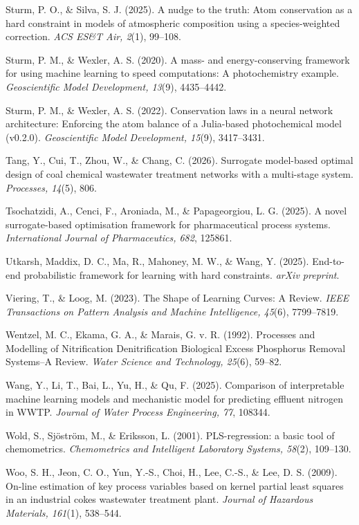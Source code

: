 \documentclass[a4paper,fleqn]{cas-sc}
\begin{document}
\noindent Sturm, P. O., \& Silva, S. J. (2025). A nudge to the truth: Atom conservation as a hard constraint in models of atmospheric composition using a species-weighted correction. \textit{ACS ES\&T Air, 2}(1), 99--108.

\noindent Sturm, P. M., \& Wexler, A. S. (2020). A mass- and energy-conserving framework for using machine learning to speed computations: A photochemistry example. \textit{Geoscientific Model Development, 13}(9), 4435--4442.

\noindent Sturm, P. M., \& Wexler, A. S. (2022). Conservation laws in a neural network architecture: Enforcing the atom balance of a Julia-based photochemical model (v0.2.0). \textit{Geoscientific Model Development, 15}(9), 3417--3431.

\noindent Tang, Y., Cui, T., Zhou, W., \& Chang, C. (2026). Surrogate model-based optimal design of coal chemical wastewater treatment networks with a multi-stage system. \textit{Processes, 14}(5), 806.

\noindent Tsochatzidi, A., Cenci, F., Aroniada, M., \& Papageorgiou, L. G. (2025). A novel surrogate-based optimisation framework for pharmaceutical process systems. \textit{International Journal of Pharmaceutics, 682}, 125861.

\noindent Utkarsh, Maddix, D. C., Ma, R., Mahoney, M. W., \& Wang, Y. (2025). End-to-end probabilistic framework for learning with hard constraints. \textit{arXiv preprint}.

\noindent Viering, T., \& Loog, M. (2023). The Shape of Learning Curves: A Review. \textit{IEEE Transactions on Pattern Analysis and Machine Intelligence, 45}(6), 7799--7819.

\noindent Wentzel, M. C., Ekama, G. A., \& Marais, G. v. R. (1992). Processes and Modelling of Nitrification Denitrification Biological Excess Phosphorus Removal Systems--A Review. \textit{Water Science and Technology, 25}(6), 59--82.

\noindent Wang, Y., Li, T., Bai, L., Yu, H., \& Qu, F. (2025). Comparison of interpretable machine learning models and mechanistic model for predicting effluent nitrogen in WWTP. \textit{Journal of Water Process Engineering, 77}, 108344.

\noindent Wold, S., Sj\"ostr\"om, M., \& Eriksson, L. (2001). PLS-regression: a basic tool of chemometrics. \textit{Chemometrics and Intelligent Laboratory Systems, 58}(2), 109--130.

\noindent Woo, S. H., Jeon, C. O., Yun, Y.-S., Choi, H., Lee, C.-S., \& Lee, D. S. (2009). On-line estimation of key process variables based on kernel partial least squares in an industrial cokes wastewater treatment plant. \textit{Journal of Hazardous Materials, 161}(1), 538--544.
\end{document}
